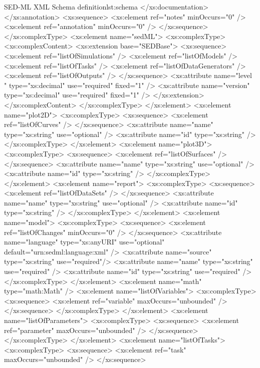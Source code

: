 \begin{myXmlLst}{SED-ML XML Schema definition}{lst:schema}
		</xs:documentation>
		</xs:annotation>
		<xs:sequence>
			<xs:element ref="notes" minOccurs="0" />
			<xs:element ref="annotation" minOccurs="0" />
		</xs:sequence>
	</xs:complexType>
	<xs:element name="sedML">
		<xs:complexType>
			<xs:complexContent>
				<xs:extension base="SEDBase">
					<xs:sequence>
						<xs:element ref="listOfSimulations" />
						<xs:element ref="listOfModels" />
						<xs:element ref="listOfTasks" />
						<xs:element ref="listOfDataGenerators" />
						<xs:element ref="listOfOutputs" />
					</xs:sequence>
					<xs:attribute name="level " type="xs:decimal" use="required"
						fixed="1" />
					<xs:attribute name="version" type="xs:decimal" use="required"
						fixed="1" />
				</xs:extension>
			</xs:complexContent>
		</xs:complexType>
	</xs:element>
	<xs:element name="plot2D">
		<xs:complexType>
			<xs:sequence>
				<xs:element ref="listOfCurves" />
			</xs:sequence>
			<xs:attribute name="name" type="xs:string" use="optional" />
			<xs:attribute name="id" type="xs:string" />
		</xs:complexType>
	</xs:element>
	<xs:element name="plot3D">
		<xs:complexType>
			<xs:sequence>
				<xs:element ref="listOfSurfaces" />
			</xs:sequence>
			<xs:attribute name="name" type="xs:string" use="optional" />
			<xs:attribute name="id" type="xs:string" />
		</xs:complexType>
	</xs:element>
	<xs:element name="report">
		<xs:complexType>
			<xs:sequence>
				<xs:element ref="listOfDataSets" />
			</xs:sequence>
			<xs:attribute name="name" type="xs:string" use="optional" />
			<xs:attribute name="id" type="xs:string" />
		</xs:complexType>
	</xs:element>
	<xs:element name="model">
		<xs:complexType>
			<xs:sequence>
				<xs:element ref="listOfChanges" minOccurs="0" />
			</xs:sequence>
			<xs:attribute name="language" type="xs:anyURI" use="optional" default="urn:sedml:language:xml" />
			<xs:attribute name="source" type="xs:string" use="required"/>
			<xs:attribute name="name" type="xs:string" use="required" />
			<xs:attribute name="id" type="xs:string" use="required" />
		</xs:complexType>
	</xs:element>
	<xs:element name="math" type="math:Math" />
	<xs:element name="listOfVariables">
		<xs:complexType>
			<xs:sequence>
				<xs:element ref="variable" maxOccurs="unbounded" />
			</xs:sequence>
		</xs:complexType>
	</xs:element>
	<xs:element name="listOfParameters">
		<xs:complexType>
			<xs:sequence>
				<xs:element ref="parameter" maxOccurs="unbounded" />
			</xs:sequence>
		</xs:complexType>
	</xs:element>
	<xs:element name="listOfTasks">
		<xs:complexType>
			<xs:sequence>
				<xs:element ref="task" maxOccurs="unbounded" />
			</xs:sequence>

\end{myXmlLst}
